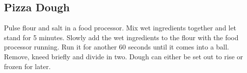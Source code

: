 \begin{recipe}
\subsection{Pizza Dough}


Pulse flour and salt in a food processor. Mix wet ingredients together and
let stand for 5 minutes. Slowly add the wet ingredients to the flour with the
food processor running. Run it for another 60 seconds until it comes into a
ball. Remove, kneed briefly and divide in two. Dough can either be set out
to rise or frozen for later.

\end{recipe}
